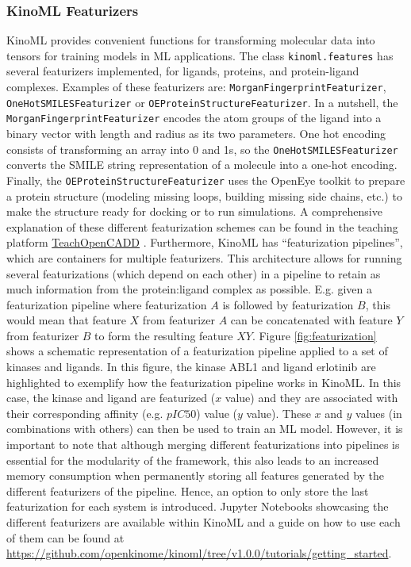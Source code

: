 \documentclass[9pt,lessons]{livecoms}
\newcommand{\revision}[1]{\textcolor{black}{#1}}
\begin{document}
\subsubsection{KinoML Featurizers}
KinoML provides convenient functions for transforming molecular data into tensors for training models in ML applications. The class \texttt{kinoml.features} has several featurizers implemented, for ligands, proteins, and protein-ligand complexes. Examples of these featurizers are: \texttt{MorganFingerprintFeaturizer}, \texttt{One\-Hot\-SMILES\-Featurizer} or \texttt{OEProteinStructureFeaturizer}. In a nutshell, the \texttt{MorganFingerprintFeaturizer} encodes the atom groups of the ligand into a binary vector with length and radius as its two parameters. One hot encoding consists of transforming an array into 0 and 1s, so the \texttt{OneHotSMILESFeaturizer} converts the SMILE string representation of a molecule into a one-hot encoding. Finally, the \texttt{OEProtein\-Structure\-Featurizer} uses the OpenEye toolkit to prepare a protein structure (modeling missing loops, building missing side chains, etc.) to make the structure ready for docking or to run simulations. 
A comprehensive explanation of these different featurization schemes can be found in the teaching platform \revision{\href{https://github.com/volkamerlab/teachopencadd/tree/master/teachopencadd/talktorials/T033_molecular_representations}{TeachOpenCADD}} \cite{Backenkhler2023}. Furthermore, KinoML has ``featurization pipelines'', which are containers for multiple featurizers. This architecture allows for running several featurizations (which depend on each other) in a pipeline to retain as much information from the protein:ligand complex as possible. E.g. given a featurization pipeline where featurization $A$ is followed by featurization $B$, this would mean that feature $X$ from featurizer $A$ can be concatenated with feature $Y$ from featurizer $B$ to form the resulting feature $XY$. Figure \ref{fig:featurization} shows a schematic representation of a featurization pipeline applied to a set of kinases and ligands. In this figure, the kinase ABL1 and ligand erlotinib are highlighted to exemplify how the featurization pipeline works in KinoML. In this case, the kinase and ligand are featurized ($x$ value) and they are associated with their corresponding affinity (e.g. $pIC50$) value ($y$ value). These $x$ and $y$ values (in combinations with others) can then be used to train an ML model. However, it is important to note that although merging different featurizations into pipelines is essential for the modularity of the framework, this also leads to an increased memory consumption when permanently storing all features generated by the different featurizers of the pipeline. Hence, an option to only store the last featurization for each system is introduced. Jupyter Notebooks showcasing the different featurizers are available within KinoML and a guide on how to use each of them can be found at \url{https://github.com/openkinome/kinoml/tree/v1.0.0/tutorials/getting_started}.\\
\end{document}
